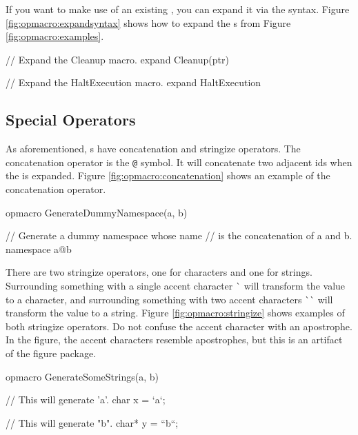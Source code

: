 {If you want to make use of an existing , you can expand it via the  syntax.  Figure \ref{fig:opmacro:expandsyntax} shows how to expand the s from Figure \ref{fig:opmacro:examples}.

\begin{opcpp}[label={fig:opmacro:expandsyntax},caption={Expanding \opcppk{opmacro}s via the \opcppk{expand} syntax.}]
// Expand the Cleanup macro.
expand Cleanup(ptr)

// Expand the HaltExecution macro.
expand HaltExecution
\end{opcpp}

\subsection{Special Operators}
\label{subsec:special_operators}

As aforementioned, s have concatenation and stringize operators.  The concatenation operator is the {\tt @} symbol.  It will concatenate two adjacent ids when the  is expanded.  Figure \ref{fig:opmacro:concatenation} shows an example of the concatenation operator.

\begin{opcpp}[label={fig:opmacro:concatenation},caption={The \opcppk{opmacro} concatenation operator.}]
opmacro GenerateDummyNamespace(a, b)
{
    // Generate a dummy namespace whose name  
    // is the concatenation of a and b. 
    namespace a@b
    {

    }
}
\end{opcpp}

There are two stringize operators, one for characters and one for strings.  Surrounding something with a single accent character \`{} will transform the value to a character, and surrounding something with two accent characters \`{}\`{} will transform the value to a string.  Figure \ref{fig:opmacro:stringize} shows examples of both stringize operators.  Do not confuse the accent character with an apostrophe.  In the figure, the accent characters resemble apostrophes, but this is an artifact of the figure package.

\begin{opcpp}[label={fig:opmacro:stringize},caption={The \opcppk{opmacro} stringize operators.}]
opmacro GenerateSomeStrings(a, b)
{
    // This will generate 'a'.
    char x = `a`;

    // This will generate "b".
    char* y = ``b``;
}
\end{opcpp}

}
